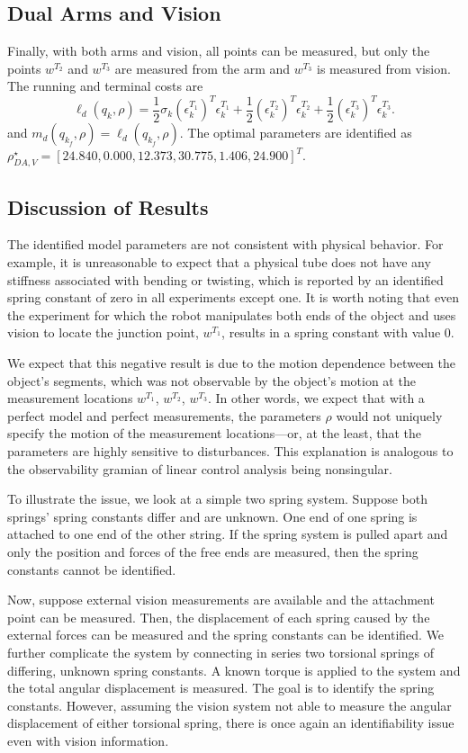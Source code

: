 \documentclass[runningheads,a4paper]{llncs}
\begin{document}
\subsection{Dual Arms and Vision \label{sec-2_vis}}
Finally, with both arms and vision, all points can be measured, but only the points $w^{T_2}$ and $w^{T_3}$ are measured from the arm and $w^{T_3}$ is measured from vision. The running and terminal costs are
\[
\ell_d(q_k,\rho) = \frac{1}{2} \sigma_k(\epsilon^{T_1}_k)^T\epsilon^{T_1}_k + \frac{1}{2} (\epsilon^{T_2}_k)^T\epsilon^{T_2}_k +\frac{1}{2} (\epsilon^{T_3}_k)^T\epsilon^{T_3}_k.
\]
and $m_d(q_{k_f},\rho) = \ell_d(q_{k_f},\rho)$. The optimal parameters are identified as $\rho^\star_{DA,V} = [24.840,  0.000, 12.373, 30.775,  1.406,  24.900]^T$.

\subsection{Discussion of Results}
The identified model parameters are not consistent with physical behavior. For example, it is unreasonable to expect that a physical tube does not have any stiffness associated with bending or twisting, which is reported by an identified spring constant of zero in all experiments except one. It is worth noting that even the experiment for which the robot manipulates both ends of the object and uses vision to locate the junction point, $w^{T_1}$, results in a spring constant with value 0. 

We expect that this negative result is due to the motion dependence between the object's segments, which was not observable by the object's motion at the measurement locations $w^{T_1}$, $w^{T_2}$, $w^{T_3}$.  In other words, we expect that with a perfect model and perfect measurements, the parameters $\rho$ would not uniquely specify the motion of the measurement locations---or, at the least, that the parameters are highly sensitive to disturbances. This explanation is analogous to the observability gramian of linear control analysis being nonsingular.  

To illustrate the issue, we look at a simple two spring system. Suppose both springs' spring constants differ and are unknown. One end of one spring is attached to one end of the other string. If the spring system is pulled apart and only the position and forces of the free ends are measured, then the spring constants cannot be identified.

Now, suppose external vision measurements are available and the attachment point can be measured. Then, the displacement of each spring caused by the external forces can be measured and the spring constants can be identified. We further complicate the system by connecting in series two torsional springs of differing, unknown spring constants. A known torque is applied to the system and the total angular displacement is measured. The goal is to identify the spring constants. However, assuming the vision system not able to measure the angular displacement of either torsional spring, there is once again an identifiability issue even with vision information.
\end{document}
